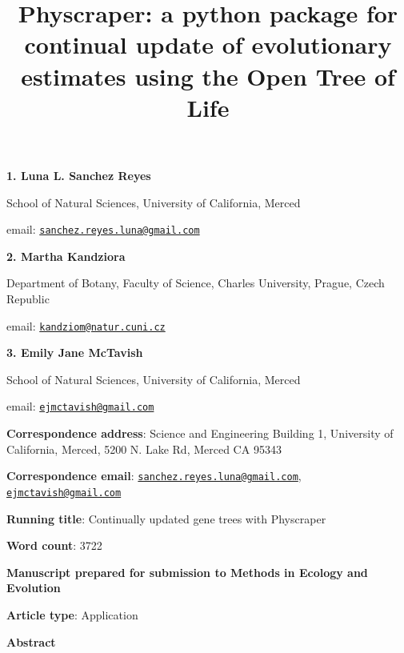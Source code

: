 \documentclass[]{article}
\title{Physcraper: a python package for continual update of evolutionary estimates using the Open Tree of Life}
\author{}
\date{\vspace{-2.5em}}
\begin{document}
\maketitle

\textbf{1. Luna L. Sanchez Reyes}

School of Natural Sciences, University of California, Merced

email: \href{mailto:sanchez.reyes.luna@gmail.com}{\nolinkurl{sanchez.reyes.luna@gmail.com}}

\textbf{2. Martha Kandziora}

Department of Botany, Faculty of Science, Charles University, Prague, Czech Republic

email: \href{mailto:kandziom@natur.cuni.cz}{\nolinkurl{kandziom@natur.cuni.cz}}

\textbf{3. Emily Jane McTavish}

School of Natural Sciences, University of California, Merced

email: \href{mailto:ejmctavish@gmail.com}{\nolinkurl{ejmctavish@gmail.com}}

\textbf{Correspondence address}: Science and Engineering Building 1, University of California, Merced, 5200 N. Lake Rd, Merced CA 95343

\textbf{Correspondence email}: \href{mailto:sanchez.reyes.luna@gmail.com}{\nolinkurl{sanchez.reyes.luna@gmail.com}}, \href{mailto:ejmctavish@gmail.com}{\nolinkurl{ejmctavish@gmail.com}}

\textbf{Running title}: Continually updated gene trees with Physcraper

\textbf{Word count}: 3722

\textbf{Manuscript prepared for submission to Methods in Ecology and Evolution}

\textbf{Article type}: Application

\newpage

\begingroup\Large

\textbf{Abstract}
\endgroup
\end{document}
